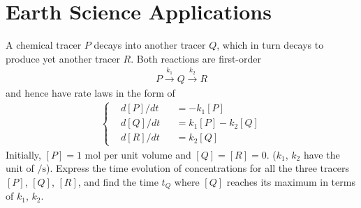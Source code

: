 \section{Earth Science Applications}

\begin{exmp}
\label{exmp:chemtrace}
A chemical tracer $P$ decays into another tracer $Q$, which in turn decays to produce yet another tracer $R$. Both reactions are first-order
\begin{align*}
P \xrightarrow{k_1} Q \xrightarrow{k_2} R
\end{align*}
and hence have rate laws in the form of
\begin{align*}
\left\{\begin{alignedat}{2}
&d[P]/dt & &= -k_1[P] \\
&d[Q]/dt & &= k_1[P] - k_2[Q] \\
&d[R]/dt & &= k_2[Q]
\end{alignedat}\right.
\end{align*}
Initially, $[P] = 1$ mol per unit volume and $[Q] = [R] = 0$. ($k_1$, $k_2$ have the unit of $\si{\per \s}$). Express the time evolution of concentrations for all the three tracers $[P]$, $[Q]$, $[R]$, and find the time $t_Q$ where $[Q]$ reaches its maximum in terms of $k_1$, $k_2$.
\end{exmp}
